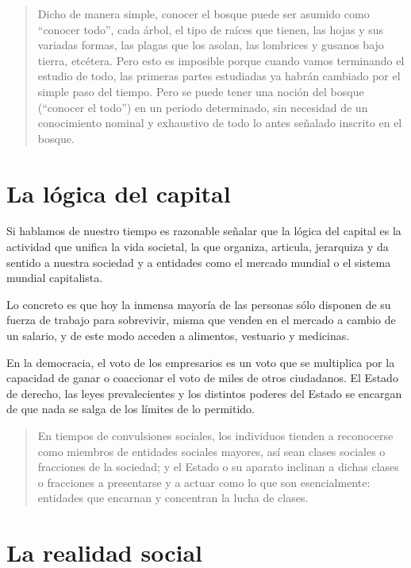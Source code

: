 \documentclass[
  letterpaper,
  DIV=11,
  numbers=noendperiod]{scrreprt}
\begin{document}
\begin{quote}
Dicho de manera simple, conocer el bosque puede ser asumido como
``conocer todo'', cada árbol, el tipo de raíces que tienen, las hojas y
sus variadas formas, las plagas que los asolan, las lombrices y gusanos
bajo tierra, etcétera. Pero esto es imposible porque cuando vamos
terminando el estudio de todo, las primeras partes estudiadas ya habrán
cambiado por el simple paso del tiempo. Pero se puede tener una noción
del bosque (``conocer el todo'') en un periodo determinado, sin
necesidad de un conocimiento nominal y exhaustivo de todo lo antes
señalado inscrito en el bosque.
\end{quote}

\section{La lógica del capital}\label{la-luxf3gica-del-capital}

Si hablamos de nuestro tiempo es razonable señalar que la lógica del
capital es la actividad que unifica la vida societal, la que organiza,
articula, jerarquiza y da sentido a nuestra sociedad y a entidades como
el mercado mundial o el sistema mundial capitalista.

Lo concreto es que hoy la inmensa mayoría de las personas sólo disponen
de su fuerza de trabajo para sobrevivir, misma que venden en el mercado
a cambio de un salario, y de este modo acceden a alimentos, vestuario y
medicinas.

En la democracia, el voto de los empresarios es un voto que se
multiplica por la capacidad de ganar o coaccionar el voto de miles de
otros ciudadanos. El Estado de derecho, las leyes prevalecientes y los
distintos poderes del Estado se encargan de que nada se salga de los
límites de lo permitido.

\begin{quote}
En tiempos de convulsiones sociales, los individuos tienden a
reconocerse como miembros de entidades sociales mayores, así sean clases
sociales o fracciones de la sociedad; y el Estado o su aparato inclinan
a dichas clases o fracciones a presentarse y a actuar como lo que son
esencialmente: entidades que encarnan y concentran la lucha de clases.
\end{quote}

\section{La realidad social}\label{la-realidad-social}
\end{document}
